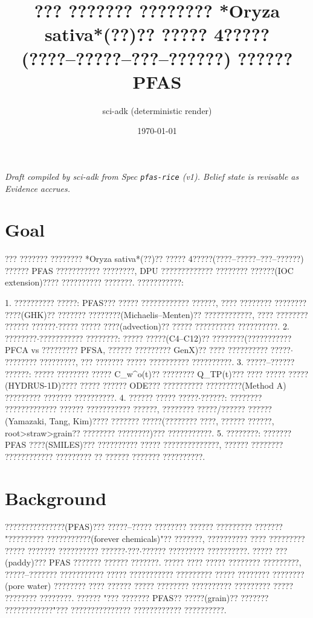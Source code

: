 \documentclass{article}
\title{??? ??????? ???????? *Oryza sativa*(??)?? ????? 4?????(????--?????--???--??????) ?????? PFAS}
\author{sci-adk (deterministic render)}
\date{\today}
\begin{document}
\maketitle

\noindent\textit{Draft compiled by sci-adk from Spec \texttt{pfas-rice} (v1). Belief state is revisable as Evidence accrues.}

\section{Goal}
??? ??????? ???????? *Oryza sativa*(??)?? ????? 4?????(????--?????--???--??????) ?????? PFAS
??????????? ????????, DPU ????????????? ???????? ??????(IOC extension)???? ?????????? ???????.
???????????:

1. ?????????? ?????: PFAS??? ????? ???????????? ??????, ???? ???????? ???????? ????(GHK)??
   ??????? ????????(Michaelis--Menten)?? ????????????, ???? ???????? ?????? ??????$\cdot$????? ?????
   ????(advection)?? ????? ?????????? ??????????.
2. ????????$\cdot$??????????? ????????: ????? ?????(C4--C12)?? ????????(??????????? PFCA vs ?????????
   PFSA, ?????? ????????? GenX)?? ???? ?????????? ?????$\cdot$???????? ?????????, ??? ???????
   ????? ?????????? ??????????.
3. ?????--?????? ??????: ????? ???????? ????? C\_w\textasciicircum{}o(t)?? ???????? Q\_TP(t)??? ???? ?????
   ?????(HYDRUS-1D)???? ????? ?????? ODE??? ?????????? ?????????(Method A) ????????? ???????
   ??????????.
4. ?????? ????? ?????$\cdot$??????: ???????? ????????????? ?????? ??????????? ??????, ????????
   ?????/?????? ??????(Yamazaki, Tang, Kim)???? ??????? ?????(???????? ????, ?????? ??????,
   root>straw>grain?? ???????? ????????)??? ???????????.
5. ????????: ??????? PFAS ????(SMILES)??? ?????????? ????? ??????????????, ?????? ????????
   ???????????? ????????? ?? ?????? ??????? ??????????.

\section{Background}
???????????????(PFAS)??? ?????--????? ???????? ?????? ????????? ??????? "?????????
???????????(forever chemicals)"?? ???????, ?????????? ???? ????????? ????? ???????
?????????? ??????$\cdot$???$\cdot$?????? ????????? ??????????. ????? ???(paddy)??? PFAS ??????? ??????
???????. ????? ???? ????? ???????? ?????????, ?????--??????? ??????????? ????? ???????????
????????? ????? ???????? ????????(pore water) ???????? ???? ?????? ????? ???????? ??????????
????????? ????? ???????? ????????. ?????? "??? ??????? PFAS?? ?????(grain)?? ???????
????????????"??? ??????????????? ???????????? ??????????.
\end{document}
